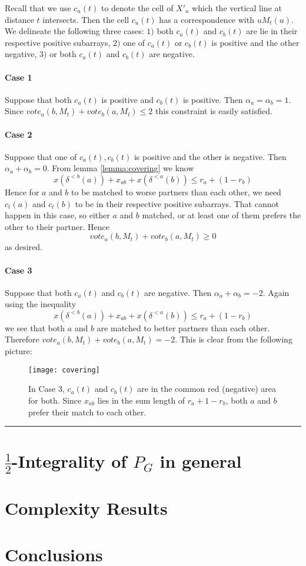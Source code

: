 \documentclass[letterpaper,12pt,oneside,onecolumn]{article}
\newenvironment{proof}{{\bf Proof:  }}{\hfill\rule{2mm}{2mm}}
\begin{document}
\begin{proof} Recall that we use $c_u(t)$ to denote the cell of $X'_u$ which the vertical line at distance $t$ intersects. Then the cell $c_u(t)$ has a correspondence with $uM_t(u)$. We delineate the following three cases: $1)$ both $c_a(t)$ and $c_b(t)$ are lie in their respective positive subarrays, $2)$ one of $c_a(t)$ or $c_b(t)$ is positive and the other negative, $3)$ or both $c_a(t)$ and $c_b(t)$ are negative. 
\paragraph{Case 1}
Suppose that both $c_a(t)$ is positive and $c_b(t)$ is positive. Then $\alpha_a = \alpha_b = 1$. Since $vote_a(b,M_t) + vote_b(a,M_t) \leq 2$ this constraint is easily satisfied.
\paragraph{Case 2}
Suppose that one of $c_a(t), c_b(t)$ is positive and the other is negative. Then $\alpha_a + \alpha_b = 0$. From lemma \ref{lemma:covering} we know
$$x(\delta^{<b}(a)) + x_{ab} + x(\delta^{<a}(b)) \leq r_a + (1-r_b)$$
Hence for $a$ and $b$ to be matched to worse partners than each other, we need $c_t(a)$ and $c_t(b)$ to be in their respective positive subarrays. That cannot happen in this case, so either $a$ and $b$ matched, or at least one of them prefers the other to their partner. Hence 
$$vote_a(b,M_t) + vote_b(a,M_t) \geq 0$$
as desired.
\paragraph{Case 3}
Suppose that both $c_a(t)$ and $c_b(t)$ are negative. Then $\alpha_a + \alpha_b = -2$. Again using the inequality 
$$x(\delta^{<b}(a)) + x_{ab} + x(\delta^{<a}(b)) \leq r_a + (1-r_b)$$
we see that both $a$ and $b$ are matched to better partners than each other. Therefore $vote_a(b,M_t) + vote_b(a,M_t) = -2$. This is clear from the following picture:
\begin{figure}[H]
\centering
\texttt{[image: covering]}
\caption{In Case 3, $c_a(t)$ and $c_b(t)$ are in the common red (negative) area for both. Since $x_{ab}$ lies in the sum length of $r_a + 1-r_b$, both $a$ and $b$ prefer their match to each other.}
\end{figure}
\end{proof}
\section{$\frac{1}{2}$-Integrality of $P_G$ in general}\label{sec:general}

\section{Complexity Results}\label{sec:complexity}

\section{Conclusions}



\end{document}
